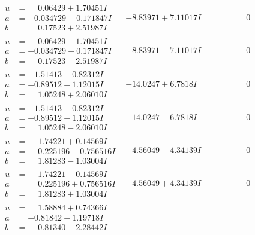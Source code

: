 \documentclass[1p]{elsarticle_modified}
\theoremstyle{definition}
\begin{document}
$$\begin{array}{c|c|c}
 \hline 
\begin{aligned}
u &= \phantom{-}0.06429 + 1.70451 I \\
a &= -0.034729 - 0.171847 I \\
b &= \phantom{-}0.17523 + 2.51987 I\end{aligned}
 & -8.83971 + 7.11017 I & \phantom{-0.000000 } 0 \\ \hline\begin{aligned}
u &= \phantom{-}0.06429 - 1.70451 I \\
a &= -0.034729 + 0.171847 I \\
b &= \phantom{-}0.17523 - 2.51987 I\end{aligned}
 & -8.83971 - 7.11017 I & \phantom{-0.000000 } 0 \\ \hline\begin{aligned}
u &= -1.51413 + 0.82312 I \\
a &= -0.89512 + 1.12015 I \\
b &= \phantom{-}1.05248 + 2.06010 I\end{aligned}
 & -14.0247 + 6.7818 I & \phantom{-0.000000 } 0 \\ \hline\begin{aligned}
u &= -1.51413 - 0.82312 I \\
a &= -0.89512 - 1.12015 I \\
b &= \phantom{-}1.05248 - 2.06010 I\end{aligned}
 & -14.0247 - 6.7818 I & \phantom{-0.000000 } 0 \\ \hline\begin{aligned}
u &= \phantom{-}1.74221 + 0.14569 I \\
a &= \phantom{-}0.225196 - 0.756516 I \\
b &= \phantom{-}1.81283 - 1.03004 I\end{aligned}
 & -4.56049 - 4.34139 I & \phantom{-0.000000 } 0 \\ \hline\begin{aligned}
u &= \phantom{-}1.74221 - 0.14569 I \\
a &= \phantom{-}0.225196 + 0.756516 I \\
b &= \phantom{-}1.81283 + 1.03004 I\end{aligned}
 & -4.56049 + 4.34139 I & \phantom{-0.000000 } 0 \\ \hline\begin{aligned}
u &= \phantom{-}1.58884 + 0.74366 I \\
a &= -0.81842 - 1.19718 I \\
b &= \phantom{-}0.81340 - 2.28442 I\end{aligned}

\end{array}$$
\end{document}
